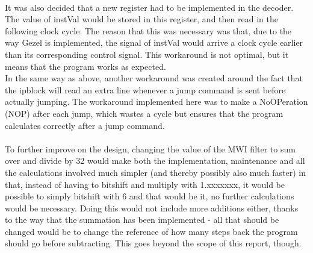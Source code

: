 \documentclass[12pt,a4paper]{article}
\begin{document}
\\
It was also decided that a new register had to be implemented in the decoder. The value of instVal would be stored in this register, and then read in the following clock cycle. The reason that this was necessary was that, due to the way Gezel is implemented, the signal of instVal would arrive a clock cycle earlier than its corresponding control signal. This workaround is not optimal, but it means that the program works as expected.\\
In the same way as above, another workaround was created around the fact that the ipblock will read an extra line whenever a jump command is sent before actually jumping. The workaround implemented here was to make a NoOPeration (NOP) after each jump, which wastes a cycle but ensures that the program calculates correctly after a jump command.\\
\\
To further improve on the design, changing the value of the MWI filter to sum over and divide by 32 would make both the implementation, maintenance and all the calculations involved much simpler (and thereby possibly also much faster) in that, instead of having to bitshift and multiply with 1.xxxxxxx, it would be possible to simply bitshift with 6 and that would be it, no further calculations would be necessary. Doing this would not include more additions either, thanks to the way that the summation has been implemented - all that should be changed would be to change the reference of how many steps back the program should go before subtracting. This goes beyond the scope of this report, though.\\
\\
\end{document}
